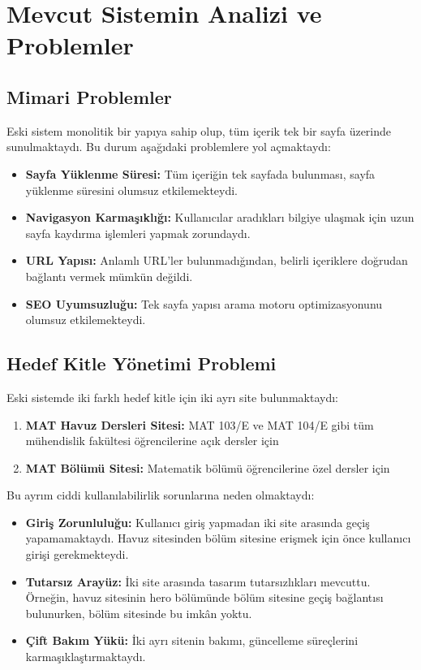 \documentclass[12pt,a4paper]{article}
\begin{document}
\section{Mevcut Sistemin Analizi ve Problemler}

\subsection{Mimari Problemler}

Eski sistem monolitik bir yapıya sahip olup, tüm içerik tek bir sayfa üzerinde sunulmaktaydı. Bu durum aşağıdaki problemlere yol açmaktaydı:

\begin{itemize}[leftmargin=*]
    \item \textbf{Sayfa Yüklenme Süresi:} Tüm içeriğin tek sayfada bulunması, sayfa yüklenme süresini olumsuz etkilemekteydi.
    \item \textbf{Navigasyon Karmaşıklığı:} Kullanıcılar aradıkları bilgiye ulaşmak için uzun sayfa kaydırma işlemleri yapmak zorundaydı.
    \item \textbf{URL Yapısı:} Anlamlı URL'ler bulunmadığından, belirli içeriklere doğrudan bağlantı vermek mümkün değildi.
    \item \textbf{SEO Uyumsuzluğu:} Tek sayfa yapısı arama motoru optimizasyonunu olumsuz etkilemekteydi.
\end{itemize}

\subsection{Hedef Kitle Yönetimi Problemi}

Eski sistemde iki farklı hedef kitle için iki ayrı site bulunmaktaydı:

\begin{enumerate}[leftmargin=*]
    \item \textbf{MAT Havuz Dersleri Sitesi:} MAT 103/E ve MAT 104/E gibi tüm mühendislik fakültesi öğrencilerine açık dersler için
    \item \textbf{MAT Bölümü Sitesi:} Matematik bölümü öğrencilerine özel dersler için
\end{enumerate}

Bu ayrım ciddi kullanılabilirlik sorunlarına neden olmaktaydı:

\begin{itemize}
    \item \textbf{Giriş Zorunluluğu:} Kullanıcı giriş yapmadan iki site arasında geçiş yapamamaktaydı. Havuz sitesinden bölüm sitesine erişmek için önce kullanıcı girişi gerekmekteydi.
    \item \textbf{Tutarsız Arayüz:} İki site arasında tasarım tutarsızlıkları mevcuttu. Örneğin, havuz sitesinin hero bölümünde bölüm sitesine geçiş bağlantısı bulunurken, bölüm sitesinde bu imkân yoktu.
    \item \textbf{Çift Bakım Yükü:} İki ayrı sitenin bakımı, güncelleme süreçlerini karmaşıklaştırmaktaydı.
\end{itemize}
\end{document}
